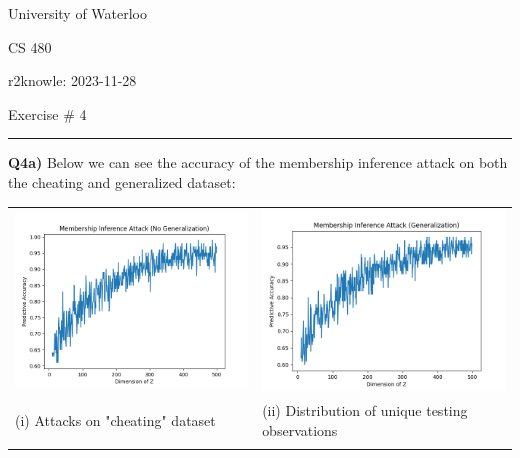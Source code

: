 \documentclass{article}
\begin{document}
\begin{titlepage}
	\setlength{\parindent}{0pt}
	\large

\vspace*{-2cm}



University of Waterloo \par
CS 480 \par
\vspace{0.05cm}
r2knowle: 2023-11-28
\vspace{0.2cm}

{\huge Exercise \# 4 \par}
\hrule

\vspace{0.5cm}
\textbf{Q4a)} Below we can see the accuracy of the membership inference attack on both the cheating and generalized dataset:

\begin{tabular}{ll}

 \includegraphics[width=.5\linewidth]{q4a1.png} &  \includegraphics[width=.5\linewidth]{q4a2.png}\\
 \hfil (i) Attacks on "cheating" dataset  \hfil & \hfil (ii) Distribution of unique testing observations \hfil \\\\
 

\end{tabular}
\end{titlepage}
\end{document}
